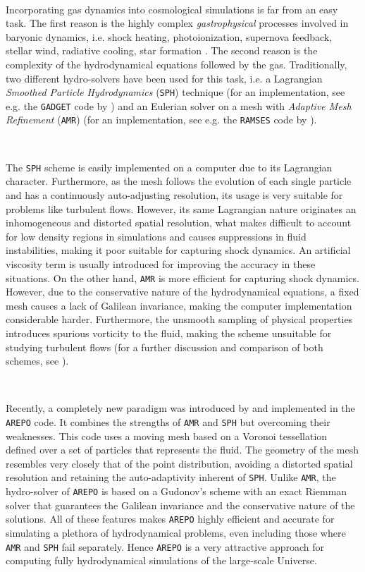 \documentclass[a4,useAMS,usenatbib,usegraphicx,12pt]{article}
\begin{document}
\

Incorporating gas dynamics into cosmological simulations is far from an easy 
task. The first reason is the highly complex \textit{gastrophysical} processes 
involved in baryonic dynamics, i.e. shock heating, photoionization, supernova 
feedback, stellar wind, radiative cooling, star formation \citep{Bond93}. The
second reason is the complexity of the hydrodynamical equations followed by 
the gas. Traditionally, two different hydro-solvers have been used for this 
task, i.e. a Lagrangian \textit{Smoothed Particle Hydrodynamics} (\texttt{SPH}) 
technique \citep{Monaghan92} (for an implementation, see e.g. the \texttt{GADGET} 
code by \citet{Springel05}) and an Eulerian solver on a mesh with \textit{
Adaptive Mesh Refinement} (\texttt{AMR}) \citep{Berger89} (for an implementation, 
see e.g. the \texttt{RAMSES} code by \citet{Teyssier02}). 

\

The \texttt{SPH} scheme is easily implemented on a computer due to its 
Lagrangian character. Furthermore, as the mesh follows the evolution of each 
single particle and has a continuously auto-adjusting resolution, its usage is 
very suitable for problems like turbulent flows. However, its same Lagrangian 
nature originates an inhomogeneous and distorted spatial resolution, what makes 
difficult to account for low density regions in simulations and causes 
suppressions in fluid instabilities, making it poor suitable for capturing shock
dynamics. An artificial viscosity term is usually introduced for improving the 
accuracy in these situations. On the other hand, \texttt{AMR} is more efficient 
for capturing shock dynamics. However, due to the conservative nature of the 
hydrodynamical equations, a fixed mesh causes a lack of Galilean invariance, 
making the computer implementation considerable harder. Furthermore, the 
unsmooth sampling of physical properties introduces spurious vorticity to the 
fluid, making the scheme unsuitable for studying turbulent flows (for a further
discussion and comparison of both schemes, see \citet{Plewa01}).

\

Recently, a completely new paradigm was introduced by \citet{Springel10} and 
implemented in the \texttt{AREPO} code. It combines the strengths of 
\texttt{AMR} and \texttt{SPH} but overcoming their weaknesses. This code uses 
a moving mesh based on a Voronoi tessellation defined over a set of particles
that represents the fluid. The geometry of the mesh resembles very closely that 
of the point distribution, avoiding a distorted spatial resolution and 
retaining the auto-adaptivity inherent of \texttt{SPH}. Unlike \texttt{AMR}, 
the hydro-solver of \texttt{AREPO} is based on a Gudonov's scheme with an exact 
Riemman solver that guarantees the Galilean invariance and the conservative 
nature of the solutions. All of these features makes \texttt{AREPO} highly 
efficient and accurate for simulating a plethora of hydrodynamical problems, 
even including those where \texttt{AMR} and \texttt{SPH} fail separately. Hence 
\texttt{AREPO} is a very attractive approach for computing fully hydrodynamical 
simulations of the large-scale Universe.
\end{document}
